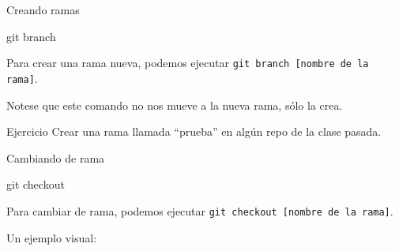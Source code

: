 \begin{frame}[t]{Creando ramas}
    \begin{comando}
        git branch
    \end{comando}

    \pause
    \begin{block}{}
        Para crear una rama nueva, podemos ejecutar \texttt{git branch [nombre de la rama]}.

        Notese que este comando no nos mueve a la nueva rama, sólo la crea.
    \end{block}

    \pause
    \begin{ejercicio}{Ejercicio}
        Crear una rama llamada ``prueba'' en algún repo de la clase pasada.
    \end{ejercicio}

\end{frame}

\begin{frame}[t]{Cambiando de rama}
    \begin{comando}
        git checkout
    \end{comando}

    \pause
    \begin{block}{}
        Para cambiar de rama, podemos ejecutar \texttt{git checkout [nombre de la rama]}.
    \end{block}

    \pause
    \vspace{0.5em}
    Un ejemplo visual:


\end{frame}

